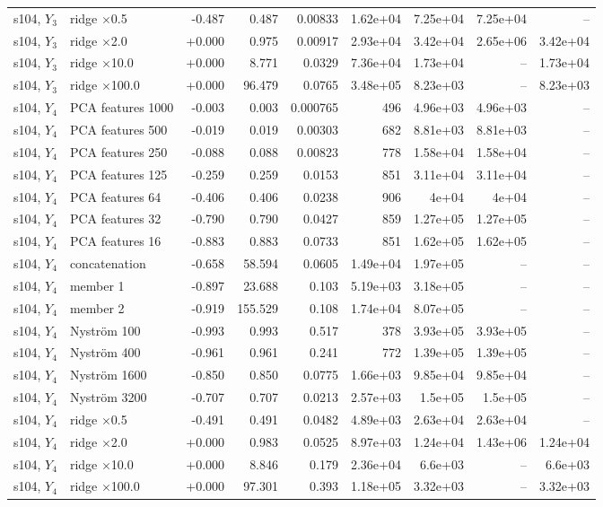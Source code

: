 \begin{landscape}
{\begin{longtable}{llrrrrrrr}
s104, $Y_3$ & ridge $\times$0.5 & -0.487 & 0.487 & 0.00833 & 1.62e+04 & 7.25e+04 & 7.25e+04 & -- \\
s104, $Y_3$ & ridge $\times$2.0 & +0.000 & 0.975 & 0.00917 & 2.93e+04 & 3.42e+04 & 2.65e+06 & 3.42e+04 \\
s104, $Y_3$ & ridge $\times$10.0 & +0.000 & 8.771 & 0.0329 & 7.36e+04 & 1.73e+04 & -- & 1.73e+04 \\
s104, $Y_3$ & ridge $\times$100.0 & +0.000 & 96.479 & 0.0765 & 3.48e+05 & 8.23e+03 & -- & 8.23e+03 \\
s104, $Y_4$ & PCA features 1000 & -0.003 & 0.003 & 0.000765 & 496 & 4.96e+03 & 4.96e+03 & -- \\
s104, $Y_4$ & PCA features 500 & -0.019 & 0.019 & 0.00303 & 682 & 8.81e+03 & 8.81e+03 & -- \\
s104, $Y_4$ & PCA features 250 & -0.088 & 0.088 & 0.00823 & 778 & 1.58e+04 & 1.58e+04 & -- \\
s104, $Y_4$ & PCA features 125 & -0.259 & 0.259 & 0.0153 & 851 & 3.11e+04 & 3.11e+04 & -- \\
s104, $Y_4$ & PCA features 64 & -0.406 & 0.406 & 0.0238 & 906 & 4e+04 & 4e+04 & -- \\
s104, $Y_4$ & PCA features 32 & -0.790 & 0.790 & 0.0427 & 859 & 1.27e+05 & 1.27e+05 & -- \\
s104, $Y_4$ & PCA features 16 & -0.883 & 0.883 & 0.0733 & 851 & 1.62e+05 & 1.62e+05 & -- \\
s104, $Y_4$ & concatenation & -0.658 & 58.594 & 0.0605 & 1.49e+04 & 1.97e+05 & -- & -- \\
s104, $Y_4$ & member 1 & -0.897 & 23.688 & 0.103 & 5.19e+03 & 3.18e+05 & -- & -- \\
s104, $Y_4$ & member 2 & -0.919 & 155.529 & 0.108 & 1.74e+04 & 8.07e+05 & -- & -- \\
s104, $Y_4$ & Nystr\"om 100 & -0.993 & 0.993 & 0.517 & 378 & 3.93e+05 & 3.93e+05 & -- \\
s104, $Y_4$ & Nystr\"om 400 & -0.961 & 0.961 & 0.241 & 772 & 1.39e+05 & 1.39e+05 & -- \\
s104, $Y_4$ & Nystr\"om 1600 & -0.850 & 0.850 & 0.0775 & 1.66e+03 & 9.85e+04 & 9.85e+04 & -- \\
s104, $Y_4$ & Nystr\"om 3200 & -0.707 & 0.707 & 0.0213 & 2.57e+03 & 1.5e+05 & 1.5e+05 & -- \\
s104, $Y_4$ & ridge $\times$0.5 & -0.491 & 0.491 & 0.0482 & 4.89e+03 & 2.63e+04 & 2.63e+04 & -- \\
s104, $Y_4$ & ridge $\times$2.0 & +0.000 & 0.983 & 0.0525 & 8.97e+03 & 1.24e+04 & 1.43e+06 & 1.24e+04 \\
s104, $Y_4$ & ridge $\times$10.0 & +0.000 & 8.846 & 0.179 & 2.36e+04 & 6.6e+03 & -- & 6.6e+03 \\
s104, $Y_4$ & ridge $\times$100.0 & +0.000 & 97.301 & 0.393 & 1.18e+05 & 3.32e+03 & -- & 3.32e+03 \\
\end{longtable}}
\end{landscape}

